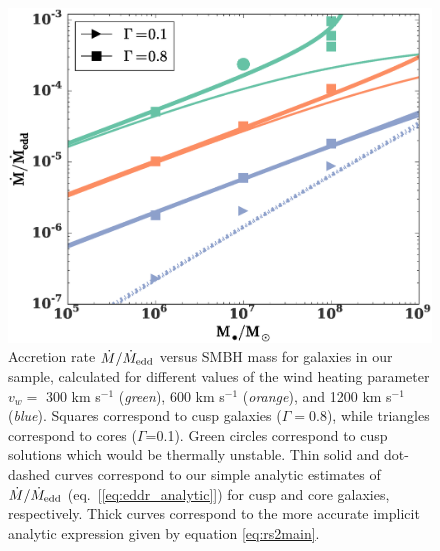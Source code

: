\documentclass[usenatbib,fleqn]{mn2e}
\newcommand{\vwO}{v_{w}}
\begin{document}
\begin{figure}
  \includegraphics[width=\columnwidth]{mdot_mass.eps}
  \caption{\label{fig:mdot_mass} Accretion rate $\dot{M}/\dot{M}_{\rm
      edd}$ versus SMBH mass for galaxies in our sample, calculated
    for different values of the wind heating parameter $\vwO =$ 300 km
    s$^{-1}$ ({\it green}), 600 km s$^{-1}$ ({\it orange}), and 1200
    km s$^{-1}$ ({\it blue}).  Squares correspond to cusp galaxies
    ($\Gamma=0.8$), while triangles correspond to cores
    ($\Gamma$=0.1). Green circles correspond to cusp solutions which
    would be thermally unstable.  Thin solid and dot-dashed curves
    correspond to our simple analytic estimates of $\dot{M}/\dot{M}_{\rm
      edd}$ (eq.~[\ref{eq:eddr_analytic}]) for cusp and core galaxies,
    respectively.  Thick curves correspond to the more accurate implicit analytic expression given by equation \eqref{eq:rs2main}.}
\end{figure}
\end{document}
